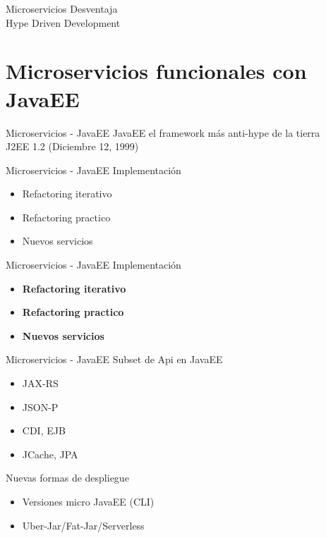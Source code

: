 \documentclass{beamer}
\begin{document}
\begin{frame}{Microservicios}
Desventaja \\

\huge Hype Driven Development
\end{frame}

\section{Microservicios funcionales con JavaEE}
\begin{frame}{Microservicios - JavaEE}
JavaEE el framework más anti-hype de la tierra\\

\huge J2EE 1.2 (Diciembre 12, 1999)
\end{frame}


\begin{frame}{Microservicios - JavaEE}
Implementación
\begin{itemize}
	\item Refactoring iterativo
	\item Refactoring practico
	\item Nuevos servicios
\end{itemize}
\end{frame}

\begin{frame}{Microservicios - JavaEE}
Implementación
\begin{itemize}
	\item \textbf{Refactoring iterativo}
	\item \textbf{Refactoring practico}
	\item \textbf{Nuevos servicios}
\end{itemize}
\end{frame}

\begin{frame}{Microservicios - JavaEE}
Subset de Api en JavaEE
\begin{itemize}
	\item JAX-RS
	\item JSON-P
	\item CDI, EJB
	\item JCache, JPA
\end{itemize}

Nuevas formas de despliegue
\begin{itemize}
	\item Versiones micro JavaEE (CLI)
	\item Uber-Jar/Fat-Jar/Serverless
\end{itemize}
\end{frame}
\end{document}

